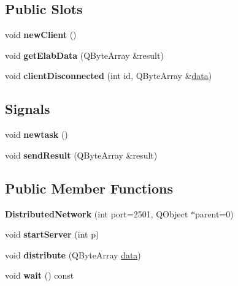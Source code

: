 \subsection*{Public Slots}
\begin{DoxyCompactItemize}
\item 
\mbox{\label{classDistributedNetwork_a55dcd6497ede05e34ead0f59c942d095}} 
void {\bfseries new\+Client} ()
\item 
\mbox{\label{classDistributedNetwork_a54ee7dae7cbece114adc5c446cbf2e3a}} 
void {\bfseries get\+Elab\+Data} (Q\+Byte\+Array \&result)
\item 
\mbox{\label{classDistributedNetwork_ab9dc432472463ee387e1b5d40279f8da}} 
void {\bfseries client\+Disconnected} (int id, Q\+Byte\+Array \&\hyperlink{structdata}{data})
\end{DoxyCompactItemize}
\subsection*{Signals}
\begin{DoxyCompactItemize}
\item 
\mbox{\label{classDistributedNetwork_ac73f8c68da9510d8b1652328cdf0cccf}} 
void {\bfseries newtask} ()
\item 
\mbox{\label{classDistributedNetwork_a162f4648ab9084f44c23d1213884f6d3}} 
void {\bfseries send\+Result} (Q\+Byte\+Array \&result)
\end{DoxyCompactItemize}
\subsection*{Public Member Functions}
\begin{DoxyCompactItemize}
\item 
\mbox{\label{classDistributedNetwork_a7467bf77e7be95c46e4c7aae6aa3945c}} 
{\bfseries Distributed\+Network} (int port=2501, Q\+Object $\ast$parent=0)
\item 
\mbox{\label{classDistributedNetwork_ad833b5e8dafeba806b37be3abb5f5821}} 
void {\bfseries start\+Server} (int p)
\item 
\mbox{\label{classDistributedNetwork_a339cc5cf3962778664e79cb54c264b18}} 
void {\bfseries distribute} (Q\+Byte\+Array \hyperlink{structdata}{data})
\item 
\mbox{\label{classDistributedNetwork_a7b3220803f522de0dfd1360c1ccde5ba}} 
void {\bfseries wait} () const
\end{DoxyCompactItemize}


